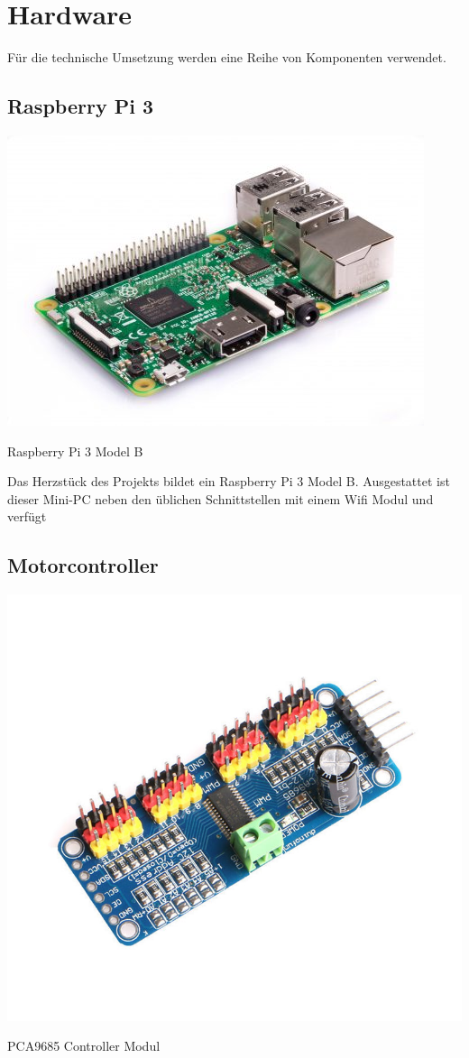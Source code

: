 \section{Hardware}
  Für die technische Umsetzung werden eine Reihe von Komponenten verwendet.

  \subsection{Raspberry Pi 3}
  
    \begin{minipage}{\columnwidth}
      \makeatletter
      \def\@captype{figure}
      \makeatother
      \centering
      \includegraphics[width=0.6\linewidth]{images/hw_raspberrypi3.jpg}
      \caption{Raspberry Pi 3 Model B}
      \label{fig:img-hw-01}
    \end{minipage}
    \vspace{0.5cm}
    Das Herzstück des Projekts bildet ein Raspberry Pi 3 Model B. Ausgestattet
    ist dieser Mini-PC neben den üblichen Schnittstellen mit einem Wifi Modul
    und verfügt

  \subsection{Motorcontroller}

    \begin{minipage}{\columnwidth}
      \makeatletter
      \def\@captype{figure}
      \makeatother
      \centering
      \includegraphics[width=0.6\linewidth]{images/hw_pca9685.jpg}
      \caption{PCA9685 Controller Modul}
      \label{fig:img-hw-02}
    \end{minipage}
    \vspace{0.5cm}

